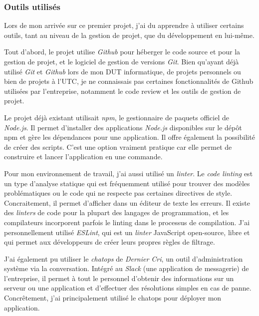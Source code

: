 \documentclass[12pt,a4paper]{article}
\begin{document}
  \bigskip

  \subsubsection{Outils utilisés}\label{outils-utilisuxe9s}

  \bigskip

  Lors de mon arrivée sur ce premier projet, j'ai du apprendre à utiliser
  certains outils, tant au niveau de la gestion de projet, que du
  développement en lui-même.

  \bigskip

  Tout d'abord, le projet utilise \emph{Github} pour héberger le code
  source et pour la gestion de projet, et le logiciel de gestion de
  versions \emph{Git}. Bien qu'ayant déjà utilisé \emph{Git} et
  \emph{Github} lors de mon DUT informatique, de projets personnels ou
  bien de projets à l'UTC, je ne connaissais pas certaines fonctionnalités
  de Github utilisées par l'entreprise, notamment le code review et les
  outils de gestion de projet.

  \bigskip

  Le projet déjà existant utilisait \emph{npm}, le gestionnaire de paquets
  officiel de \emph{Node.js}. Il permet d'installer des applications
  \emph{Node.js} disponibles sur le dépôt npm et gère les dépendances pour
  une application. Il offre également la possibilité de créer des scripts.
  C'est une option vraiment pratique car elle permet de construire et
  lancer l'application en une commande.

  \bigskip

  Pour mon environnement de travail, j'ai aussi utilisé un \emph{linter}.
  Le \emph{code linting} est un type d'analyse statique qui est
  fréquemment utilisé pour trouver des modèles problématiques ou le code
  qui ne respecte pas certaines directives de style. Concraitement, il
  permet d'afficher dans un éditeur de texte les erreurs. Il existe des
  \emph{linters} de code pour la plupart des langages de programmation, et
  les compilateurs incorporent parfois le linting dans le processus de
  compilation. J'ai personnellement utilisé \emph{ESLint}, qui est un
  \emph{linter} JavaScript open-source, libre et qui permet aux
  développeurs de créer leurs propres règles de filtrage.

  \bigskip

  J'ai également pu utiliser le \emph{chatops} de \emph{Dernier Cri}, un
  outil d'administration système via la conversation. Intégré au
  \emph{Slack} (une application de messagerie) de l'entreprise, il permet
  à tout le personnel d'obtenir des informations sur un serveur ou une
  application et d'effectuer des résolutions simples en cas de panne.
  Concrêtement, j'ai principalement utilisé le chatops pour déployer mon
  application.
\end{document}
